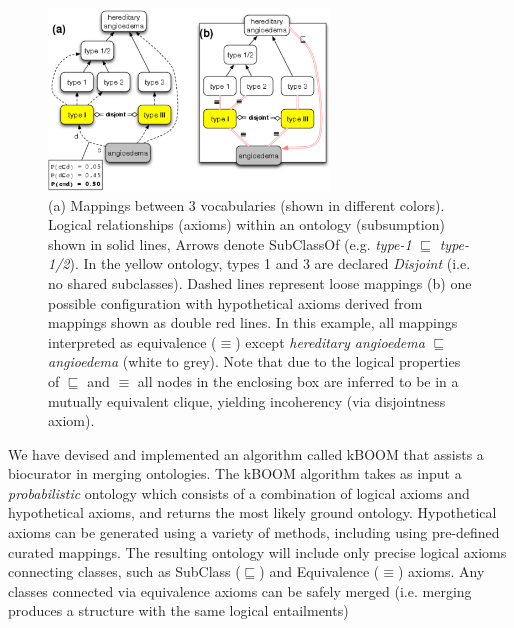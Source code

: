 \documentclass{my}
\begin{document}
\begin{figure}
\center
\includegraphics[width=7.5cm]{mapping-example}
\caption{(a) Mappings between 3 vocabularies (shown in different
  colors). Logical relationships (axioms) within an ontology
  (subsumption) shown in solid lines, Arrows denote SubClassOf
  (e.g. \emph{type-1} $\sqsubseteq$ \emph{type-1/2}). In the yellow
  ontology, types 1 and 3 are declared \emph{Disjoint} (i.e. no shared
  subclasses). Dashed lines represent loose mappings (b) one possible
  configuration with hypothetical axioms derived from mappings shown
  as double red lines. In this example, all mappings interpreted as
  equivalence ($\equiv$) except \emph{hereditary angioedema}
  $\sqsubseteq$ \emph{angioedema} (white to grey). Note that due to
  the logical properties of $\sqsubseteq$ and $\equiv$ all nodes in
  the enclosing box are inferred to be in a mutually equivalent
  clique, yielding incoherency (via disjointness axiom).}
\label{fig:mapping-example}
\end{figure}

We have devised and implemented an algorithm called kBOOM that assists
a biocurator in merging ontologies. The kBOOM algorithm takes as input
a \emph{probabilistic} ontology which consists of a combination of
logical axioms and hypothetical axioms, and returns the most likely
ground ontology. Hypothetical axioms can be generated using a variety
of methods, including using pre-defined curated mappings. The
resulting ontology will include only precise logical axioms
connecting classes, such as SubClass ($\sqsubseteq$) and Equivalence
($\equiv$) axioms. Any classes connected via equivalence axioms can be
safely merged (i.e. merging produces a structure with the same logical entailments)
\end{document}

